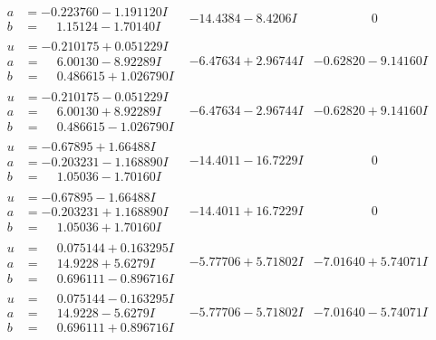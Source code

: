 \documentclass[1p]{elsarticle_modified}
\theoremstyle{definition}
\begin{document}
$$\begin{array}{c|c|c}
\begin{aligned}
a &= -0.223760 - 1.191120 I \\
b &= \phantom{-}1.15124 - 1.70140 I\end{aligned}
 & -14.4384 - 8.4206 I & \phantom{-0.000000 } 0 \\ \hline\begin{aligned}
u &= -0.210175 + 0.051229 I \\
a &= \phantom{-}6.00130 - 8.92289 I \\
b &= \phantom{-}0.486615 + 1.026790 I\end{aligned}
 & -6.47634 + 2.96744 I & -0.62820 - 9.14160 I \\ \hline\begin{aligned}
u &= -0.210175 - 0.051229 I \\
a &= \phantom{-}6.00130 + 8.92289 I \\
b &= \phantom{-}0.486615 - 1.026790 I\end{aligned}
 & -6.47634 - 2.96744 I & -0.62820 + 9.14160 I \\ \hline\begin{aligned}
u &= -0.67895 + 1.66488 I \\
a &= -0.203231 - 1.168890 I \\
b &= \phantom{-}1.05036 - 1.70160 I\end{aligned}
 & -14.4011 - 16.7229 I & \phantom{-0.000000 } 0 \\ \hline\begin{aligned}
u &= -0.67895 - 1.66488 I \\
a &= -0.203231 + 1.168890 I \\
b &= \phantom{-}1.05036 + 1.70160 I\end{aligned}
 & -14.4011 + 16.7229 I & \phantom{-0.000000 } 0 \\ \hline\begin{aligned}
u &= \phantom{-}0.075144 + 0.163295 I \\
a &= \phantom{-}14.9228 + 5.6279 I \\
b &= \phantom{-}0.696111 - 0.896716 I\end{aligned}
 & -5.77706 + 5.71802 I & -7.01640 + 5.74071 I \\ \hline\begin{aligned}
u &= \phantom{-}0.075144 - 0.163295 I \\
a &= \phantom{-}14.9228 - 5.6279 I \\
b &= \phantom{-}0.696111 + 0.896716 I\end{aligned}
 & -5.77706 - 5.71802 I & -7.01640 - 5.74071 I \\ \hline\begin{aligned}

\end{aligned}
\end{array}$$
\end{document}
